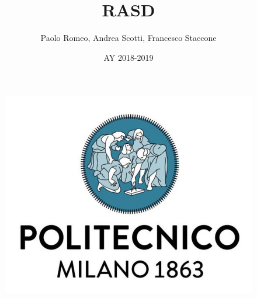 \documentclass{article}
\begin{document}
	\begin{figure}
  	\includegraphics[width=\linewidth]{./images/Logo-PoliMi.jpg}
	\end{figure}
\title{\textbf{RASD}}
\author{Paolo Romeo, Andrea Scotti, Francesco Staccone}
\date{AY 2018-2019}
\maketitle{}
\end{document}
